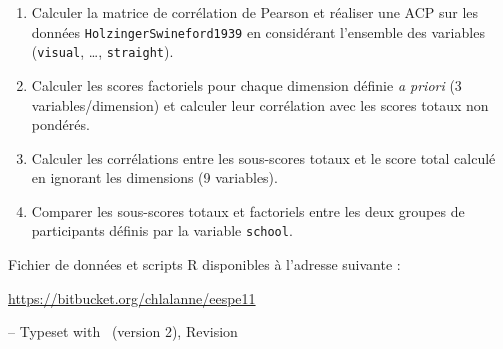 \begin{enumerate}
\item Calculer la matrice de corrélation de Pearson et réaliser une ACP sur les
  données \texttt{HolzingerSwineford1939} en considérant l'ensemble des
  variables (\texttt{visual}, \ldots, \texttt{straight}).
\item Calculer les scores factoriels pour chaque dimension définie \emph{a
    priori} (3 variables/dimension) et calculer leur corrélation avec les scores
  totaux non pondérés.
\item Calculer les corrélations entre les sous-scores totaux et le score total
  calculé en ignorant les dimensions (9 variables).
\item Comparer les sous-scores totaux et factoriels entre les deux groupes de
  participants définis par la variable \texttt{school}.
\end{enumerate}


\foilhead{}

Fichier de données et scripts R disponibles à l'adresse suivante :\newline
{\centering \url{https://bitbucket.org/chlalanne/eespe11}\par}
\vfill

\raggedleft \scriptsize -- Typeset with \FoilTeX\ (version 2), Revision \VCRevision


